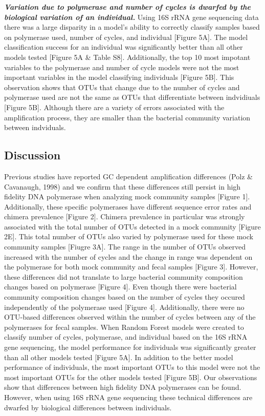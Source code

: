 \documentclass[11pt,]{article}
\begin{document}
\textbf{\emph{Variation due to polymerase and number of cycles is
dwarfed by the biological variation of an individual.}} Using 16S rRNA
gene sequencing data there was a large disparity in a model's ability to
correctly classify samples based on polymerase used, number of cycles,
and individual {[}Figure 5A{]}. The model classification success for an
individual was significantly better than all other models tested
{[}Figure 5A \& Table S8{]}. Additionally, the top 10 most impotant
variables to the polymerase and number of cycle models were not the most
important variables in the model classifying individuals {[}Figure
5B{]}. This observation shows that OTUs that change due to the number of
cycles and polymerase used are not the same as OTUs that differentiate
between indvidiuals {[}Figure 5B{]}. Although there are a variety of
errors associated with the amplification process, they are smaller than
the bacterial community variation between indviduals.

\newpage

\subsection{Discussion}\label{discussion}

Previous studies have reported GC dependent amplification differences
(Polz \& Cavanaugh, 1998) and we confirm that these differences still
persist in high fidelity DNA polymerase when analyzing mock community
samples {[}Figure 1{]}. Additionally, these specific polymerases have
different sequence error rates and chimera prevalence {[}Figure 2{]}.
Chimera prevalence in particular was strongly associated with the total
number of OTUs detected in a mock community {[}Figure 2E{]}. This total
number of OTUs also varied by polymerase used for these mock community
samples {[}Fiugre 3A{]}. The range in the number of OTUs observed
increased with the number of cycles and the change in range was
dependent on the polymerase for both mock community and fecal samples
{[}Figure 3{]}. However, these differences did not translate to large
bacterial community composition changes based on polymerase {[}Figure
4{]}. Even though there were bacterial community composition changes
based on the number of cycles they occured independently of the
polymerase used {[}Figure 4{]}. Additionally, there were no OTU-based
differences observed within the number of cycles between any of the
polymerases for fecal samples. When Random Forest models were created to
classify number of cycles, polymerase, and individual based on the 16S
rRNA gene sequencing, the model performance for individuals was
significantly greater than all other models tested {[}Figure 5A{]}. In
addition to the better model performance of individuals, the most
important OTUs to this model were not the most important OTUs for the
other models tested {[}Figure 5B{]}. Our observations show that
differences between high fidelity DNA polymerases can be found. However,
when using 16S rRNA gene sequencing these technical differences are
dwarfed by biological differences between individuals.
\end{document}
